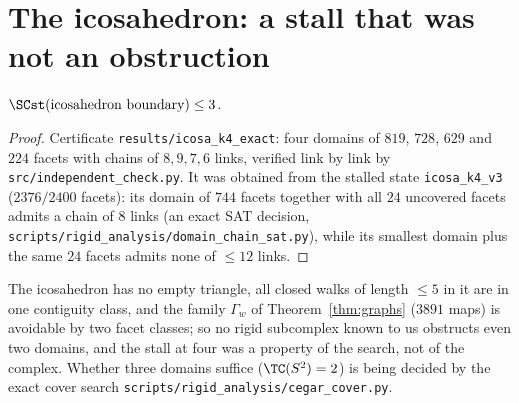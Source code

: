 \section{The icosahedron: a stall that was not an obstruction}

\begin{proposition}\label{prop:icosa}
$\SCst(\text{icosahedron boundary})\le3$.
\end{proposition}
\begin{proof}
Certificate \texttt{results/icosa\_k4\_exact}: four domains of $819$, $728$, $629$ and $224$ facets with chains of
$8,9,7,6$ links, verified link by link by \texttt{src/independent\_check.py}.  It was obtained from the stalled
state \texttt{icosa\_k4\_v3} ($2376/2400$ facets): its domain of $744$ facets together with all $24$ uncovered
facets admits a chain of $8$ links (an exact SAT decision, \texttt{scripts/rigid\_analysis/domain\_chain\_sat.py}),
while its smallest domain plus the same $24$ facets admits none of $\le12$ links.
\end{proof}

\begin{remark}
The icosahedron has no empty triangle, all closed walks of length $\le5$ in it are in one contiguity class, and the
family $\Gamma_w$ of Theorem~\ref{thm:graphs} ($3891$ maps) is avoidable by two facet classes; so no rigid
subcomplex known to us obstructs even two domains, and the stall at four was a property of the search, not of the
complex.  Whether three domains suffice ($\TC(S^2)=2$) is being decided by the exact cover search
\texttt{scripts/rigid\_analysis/cegar\_cover.py}.
\end{remark}
